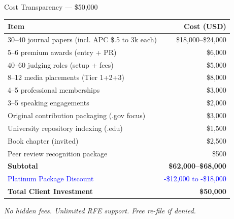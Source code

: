 \documentclass[aspectratio=169, 10pt]{beamer}
\begin{document}
	
	\begin{frame}{Cost Transparency — \$50,000}
		\begin{table}
			\centering
			\scriptsize
			\begin{tabular}{l r}
				\toprule
				Item & Cost (USD) \\
				\midrule
				30–40 journal papers (incl. APC \$.5 to 3k each) & \$18,000–\$24,000 \\
				5–6 premium awards (entry + PR) & \$6,000 \\
				40–60 judging roles (setup + fees) & \$5,000 \\
				8–12 media placements (Tier 1+2+3) & \$8,000 \\
				4–5 professional memberships & \$3,000 \\
				3–5 speaking engagements & \$2,000 \\
				Original contribution packaging (.gov focus) & \$3,000 \\
				University repository indexing (.edu) & \$1,500 \\
				Book chapter (invited) & \$2,500 \\
				Peer review recognition package & \$500 \\
				\textbf{Subtotal} & \textbf{\$62,000–\$68,000} \\
				\midrule
				\textcolor{blue}{Platinum Package Discount} & \textcolor{blue}{-\$12,000 to -\$18,000} \\
				\textbf{Total Client Investment} & \textbf{\$50,000} \\
				\bottomrule
			\end{tabular}
		\end{table}
		\centering
		\textit{No hidden fees. Unlimited RFE support. Free re-file if denied.}
	\end{frame}
	
\end{document}
